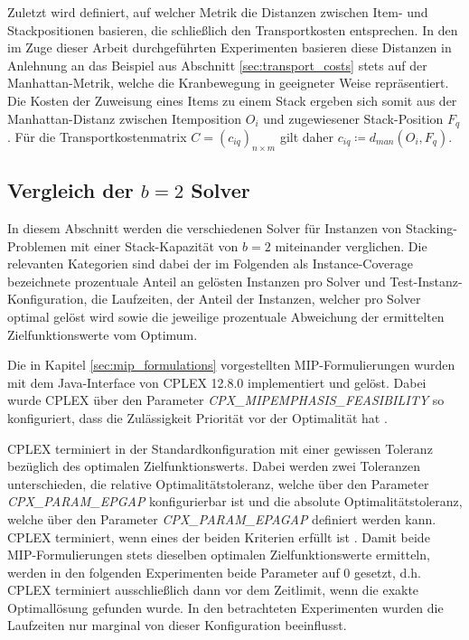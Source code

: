 Zuletzt wird definiert, auf welcher Metrik die Distanzen zwischen Item- und Stackpositionen
basieren, die schließlich den Transportkosten entsprechen.
In den im Zuge dieser Arbeit durchgeführten Experimenten basieren diese Distanzen in Anlehnung an das Beispiel
aus Abschnitt \ref{sec:transport_costs} stets auf der Manhattan-Metrik, welche die Kranbewegung in geeigneter Weise repräsentiert. Die Kosten der Zuweisung eines Items zu einem Stack ergeben sich somit aus der Manhattan-Distanz zwischen Itemposition $O_i$ und zugewiesener Stack-Position $F_q$. Für die Transportkostenmatrix $C = (c_{iq})_{n \times m}$ gilt
daher $c_{iq} \coloneqq d_{man}(O_i, F_q)$.

\subsection{Vergleich der $b = 2$ Solver}
\label{sec:solver_comp_b=2}

In diesem Abschnitt werden die verschiedenen Solver für Instanzen von Stacking-Problemen mit einer Stack-Kapazität von $b=2$ miteinander verglichen. Die relevanten Kategorien sind dabei der im Folgenden als Instance-Coverage bezeichnete prozentuale Anteil an gelösten Instanzen pro Solver und Test-Instanz-Konfiguration, die Laufzeiten, der Anteil der Instanzen, welcher pro Solver optimal gelöst wird
sowie die jeweilige prozentuale Abweichung der ermittelten Zielfunktionswerte vom Optimum.

Die in Kapitel \ref{sec:mip_formulations} vorgestellten MIP-Formulierungen wurden mit dem Java-Interface von \textsc{CPLEX} 12.8.0 implementiert
und gelöst. Dabei wurde \textsc{CPLEX} über den Parameter \textit{CPX\_MIPEMPHASIS\_FEASIBILITY} so konfiguriert, dass die Zulässigkeit
Priorität vor der Optimalität hat \cite{IBM_DOC}.

\textsc{CPLEX} terminiert in der Standardkonfiguration mit einer gewissen Toleranz bezüglich des optimalen Zielfunktionswerts.
Dabei werden zwei Toleranzen unterschieden, die relative Optimalitätstoleranz, welche über den Parameter
\textit{CPX\_PARAM\_EPGAP} konfigurierbar ist und die absolute Optimalitätstoleranz, welche über den Parameter
\textit{CPX\_PARAM\_EPAGAP} definiert werden kann. \textsc{CPLEX} terminiert, wenn eines der beiden Kriterien erfüllt ist \cite{CPLEX2015}.
Damit beide MIP-Formulierungen stets dieselben optimalen Zielfunktionswerte ermitteln, werden in den folgenden
Experimenten beide Parameter auf $0$ gesetzt, d.h. \textsc{CPLEX} terminiert ausschließlich dann vor dem Zeitlimit,
wenn die exakte Optimallösung gefunden wurde. In den betrachteten Experimenten wurden die Laufzeiten nur marginal
von dieser Konfiguration beeinflusst.

